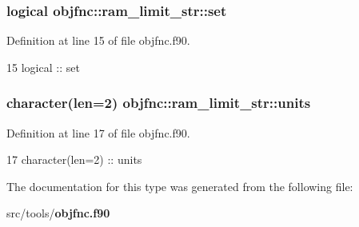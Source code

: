 \subsubsection[{set}]{\setlength{\rightskip}{0pt plus 5cm}logical objfnc\+::ram\+\_\+limit\+\_\+str\+::set\hspace{0.3cm}{\ttfamily [private]}}\label{structobjfnc_1_1ram__limit__str_a5d80c96ba9e923847671b347fd1fd17f}


Definition at line 15 of file objfnc.\+f90.


\begin{DoxyCode}
15     \textcolor{keywordtype}{logical} :: set
\end{DoxyCode}
\subsubsection[{units}]{\setlength{\rightskip}{0pt plus 5cm}character(len=2) objfnc\+::ram\+\_\+limit\+\_\+str\+::units\hspace{0.3cm}{\ttfamily [private]}}\label{structobjfnc_1_1ram__limit__str_a80c1206f922ed466e7972116fba2b80b}


Definition at line 17 of file objfnc.\+f90.


\begin{DoxyCode}
17     \textcolor{keywordtype}{character(len=2)} :: units
\end{DoxyCode}


The documentation for this type was generated from the following file\+:\begin{DoxyCompactItemize}
\item 
src/tools/{\bf objfnc.\+f90}\end{DoxyCompactItemize}
